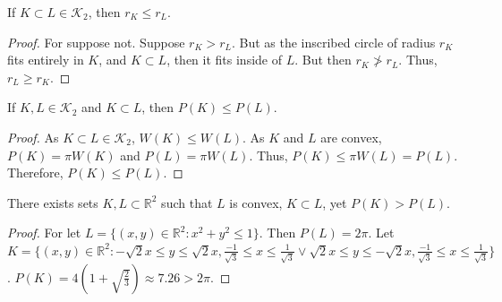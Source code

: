 \documentclass[crop=false,class=book,oneside]{standalone}
\begin{document}
            \begin{theorem}
            If $K\subset L \in \mathscr{K}_2$, then $r_K \leq r_L$.
            \end{theorem}
            \begin{proof}
            For suppose not. Suppose $r_K> r_L$. But as the inscribed circle of radius $r_K$ fits entirely in $K$, and $K\subset L$, then it fits inside of $L$. But then $r_K \not > r_L$. Thus, $r_L \geq r_K$.
            \end{proof}
            \begin{theorem}
            If $K,L\in \mathscr{K}_2$ and $K\subset L$, then $P(K)\leq P(L)$.
            \end{theorem}
            \begin{proof}
            As $K\subset L\in  \mathscr{K}_2$, $W(K)\leq W(L)$. As $K$ and $L$ are convex, $P(K)=\pi W(K)$ and $P(L)=\pi W(L)$. Thus, $P(K) \leq \pi W(L) = P(L)$. Therefore, $P(K)\leq P(L)$.
            \end{proof}
            \begin{theorem}
            There exists sets $K,L\subset \mathbb{R}^2$ such that $L$ is convex, $K\subset L$, yet $P(K)>P(L)$.
            \end{theorem}
            \begin{proof}
            For let $L = \{(x,y)\in \mathbb{R}^2: x^2 + y^2 \leq 1\}$. Then $P(L) = 2\pi$. Let $K = \{(x,y)\in \mathbb{R}^2: -\sqrt{2}x\leq y \leq \sqrt{2}x,\frac{-1}{\sqrt{3}} \leq x \leq \frac{1}{\sqrt{3}} \lor \sqrt{2}x\leq y \leq -\sqrt{2}x,\frac{-1}{\sqrt{3}} \leq x \leq \frac{1}{\sqrt{3}} \}$. $P(K) = 4(1+ \sqrt{\frac{2}{3}}) \approx 7.26>2\pi$.
            \end{proof}
\end{document}
